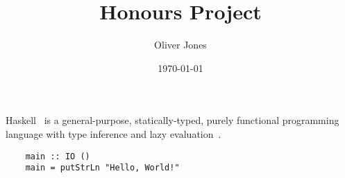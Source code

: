 \documentclass[12pt, a4paper]{article}
\title{Honours Project}
\author{Oliver Jones}
\date{\today}
\begin{document}
\maketitle
\tableofcontents

Haskell~\cite{haskell} is a general-purpose, statically-typed, purely
    functional programming language with type inference and lazy
    evaluation~\cite{wiki-haskell}.

\begin{verbatim}
    main :: IO ()
    main = putStrLn "Hello, World!"
\end{verbatim}

\printbibliography
\end{document}
